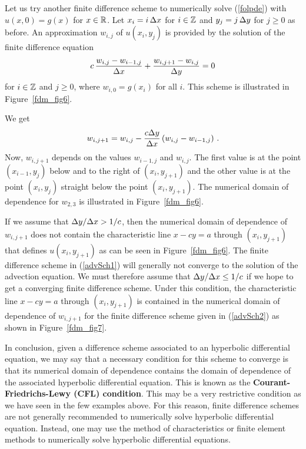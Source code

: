 Let us try another finite difference scheme to numerically solve
(\ref{folpde}) with $u(x,0) = g(x)$ for $x \in \mathbb{R}$.   Let
$x_i = i\, \Delta{x}$ for $i \in \mathbb{Z}$ and $y_j = j\, \Delta{y}$ for $j\geq 0$
as before.  An approximation $w_{i,j}$ of $u(x_i,y_j)$ is provided by
the solution of the finite difference equation
\begin{equation} \label{advSch2}
c\, \frac{w_{i,j}- w_{i-1,j}}{\Delta{x}} + \frac{w_{i,j+1} - w_{i,j}}{\Delta{y}}
= 0
\end{equation}
for $i \in \mathbb{Z}$ and $j \geq 0$, where $w_{i,0} = g(x_i)$ for all $i$.
This scheme is illustrated in Figure~\ref{fdm_fig6}.


We get
\[
w_{i,j+1} = w_{i,j} - \frac{c \Delta{y}}{\Delta{x}} \, (w_{i,j} - w_{i-1,j}) \ .
\]
Now, $w_{i,j+1}$ depends on the values $w_{i-1,j}$ and $w_{i,j}$.  The
first value is at the point $(x_{i-1},y_j)$ below and to the right of 
$(x_i,y_{j+1})$ and the other value is at the point $(x_i,y_j)$
straight below the point $(x_i,y_{j+1})$.  The numerical domain of
dependence for $w_{2,3}$ is illustrated in Figure~\ref{fdm_fig6}.

If we assume that $\Delta{y}/\Delta{x} > 1/c$, then
the numerical domain of dependence of $w_{i,j+1}$ does not contain the
characteristic line $x - cy = a$ through $(x_i,y_{j+1})$ that defines
$u(x_i,y_{j+1})$ as can be seen in Figure~\ref{fdm_fig6}.  The finite
difference scheme in (\ref{advSch1}) will generally not converge to the
solution of the advection equation.  We must therefore assume that
$\Delta{y}/\Delta{x} \leq 1/c$ if we hope to get a converging finite
difference scheme.  Under this condition, the characteristic line
$x - cy = a$ through $(x_i,y_{j+1})$ is contained in the numerical
domain of dependence of $w_{i,j+1}$ for the finite difference scheme
given in (\ref{advSch2}) as shown in Figure~\ref{fdm_fig7}.


In conclusion, given a difference scheme associated to an hyperbolic
differential equation, we may say that a necessary condition for this
scheme to converge is that its numerical domain of dependence contains
the domain of dependence of the associated hyperbolic differential
equation.  This is known as the {\bfseries Courant-Friedrichs-Lewy (CFL)
condition}.
This may be a very restrictive condition as we have seen
in the few examples above.  For this reason, finite difference
schemes are not generally recommended to numerically solve hyperbolic
differential equation.  Instead, one may use the method of
characteristics or finite element methods to numerically solve
hyperbolic differential equations.

